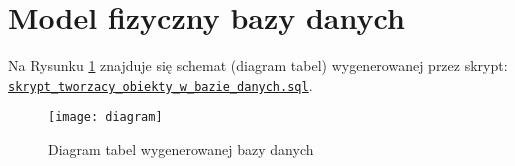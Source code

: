 \section{Model fizyczny bazy danych}

Na Rysunku \ref{fig:diagram} znajduje się schemat (diagram tabel) wygenerowanej przez skrypt:
\\
\href{run:skrypt_tworzacy_obiekty_w_bazie_danych.sql}{\texttt{skrypt\_tworzacy\_obiekty\_w\_bazie\_danych.sql}}.

\begin{figure}[h]
	\centering
	\caption{Diagram tabel wygenerowanej bazy danych}
    \texttt{[image: diagram]}
	\label{fig:diagram}
\end{figure}